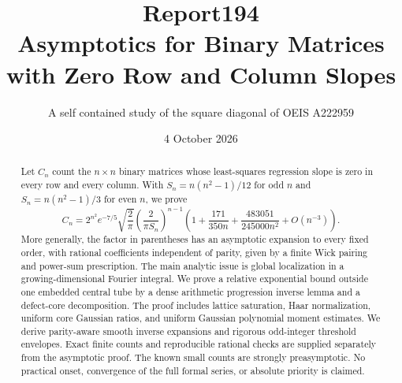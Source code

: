 \documentclass[11pt]{article}
\title{Report194\\[5pt]Asymptotics for Binary Matrices\\with Zero Row and Column Slopes}
\author{A self contained study of the square diagonal of OEIS A222959}
\date{4 October 2026}
\theoremstyle{definition}\newtheorem{definition}[theorem]{Definition}
\theoremstyle{remark}\newtheorem{remark}[theorem]{Remark}
\begin{document}
\maketitle
\begin{abstract}
Let $C_n$ count the $n\times n$ binary matrices whose least-squares regression
slope is zero in every row and every column. With
$S_n=n(n^2-1)/12$ for odd $n$ and $S_n=n(n^2-1)/3$ for even $n$, we prove
\[
 C_n=2^{n^2}e^{-7/5}\sqrt{\frac2\pi}
       \left(\frac{2}{\pi S_n}\right)^{n-1}
       \left(1+\frac{171}{350n}+\frac{483051}{245000n^2}+O(n^{-3})\right).
\]
More generally, the factor in parentheses has an asymptotic expansion to every
fixed order, with rational coefficients independent of parity, given by a finite
Wick pairing and power-sum prescription. The main analytic issue is global
localization in a growing-dimensional Fourier integral. We prove a relative
exponential bound outside one embedded central tube by a dense arithmetic
progression inverse lemma and a defect-core decomposition. The proof includes
lattice saturation, Haar normalization, uniform core Gaussian ratios, and
uniform Gaussian polynomial moment estimates. We derive parity-aware smooth
inverse expansions and rigorous odd-integer threshold envelopes. Exact finite
counts and reproducible rational checks are supplied separately from the
asymptotic proof. The known small counts are strongly preasymptotic. No practical
onset, convergence of the full formal series, or absolute priority is claimed.
\end{abstract}
\end{document}
